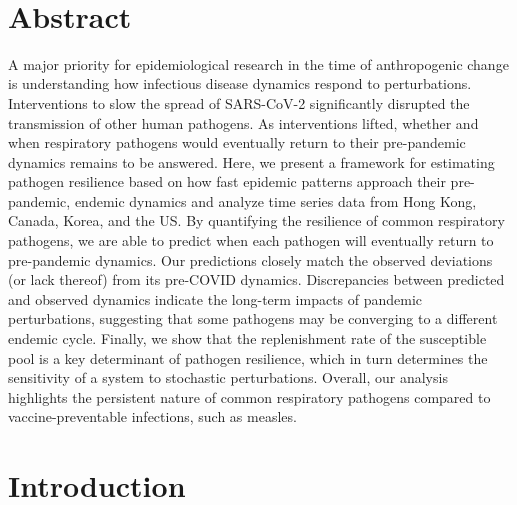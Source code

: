 \documentclass[12pt]{article}
\date{\today}
\begin{document}
\begin{flushleft}{
	\Large
	\textbf{}
}
\newline
\\
\bigskip
\end{flushleft}

\section*{Abstract}

A major priority for epidemiological research in the time of anthropogenic change is understanding how infectious disease dynamics respond to perturbations.
Interventions to slow the spread of SARS-CoV-2 significantly disrupted the transmission of other human pathogens. 
As interventions lifted, whether and when respiratory pathogens would eventually return to their pre-pandemic dynamics remains to be answered.
Here, we present a framework for estimating pathogen resilience based on how fast epidemic patterns approach their pre-pandemic, endemic dynamics and analyze time series data from Hong Kong, Canada, Korea, and the US.
By quantifying the resilience of common respiratory pathogens, we are able to predict when each pathogen will eventually return to pre-pandemic dynamics.
Our predictions closely match the observed deviations (or lack thereof) from its pre-COVID dynamics.
Discrepancies between predicted and observed dynamics indicate the long-term impacts of pandemic perturbations, suggesting that some pathogens may be converging to a different endemic cycle.
Finally, we show that the replenishment rate of the susceptible pool is a key determinant of pathogen resilience, which in turn determines the sensitivity of a system to stochastic perturbations.
Overall, our analysis highlights the persistent nature of common respiratory pathogens compared to vaccine-preventable infections, such as measles.

\pagebreak

\section*{Introduction}
\end{document}
